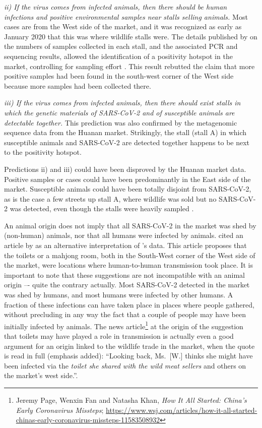 \documentclass[11pt]{article}
\def \sct {\mbox{SARS-CoV-2}}
\begin{document}
\textit{ii) If the virus comes from infected animals, then there should be human infections and positive environmental samples near stalls selling animals.} 
Most cases are from the West side of the market, and it was recognized as early as January 2020 that this was where wildlife stalls were. The details published by \citet{Liu2023Nature} on the numbers of samples collected in each stall, and the associated PCR and sequencing results, allowed the identification of a positivity hotspot in the market, controlling for sampling effort \citep{ACC2023bioRxiv}. This result rebutted the claim that more positive samples had been found in the south-west corner of the West side because more samples had been collected there.

\textit{iii) If the virus comes from infected animals, then there should exist stalls in which the genetic materials of SARS-CoV-2 and of susceptible animals are detectable together.} 
This prediction was also confirmed by the metagenomic sequence data from the Huanan market. Strikingly, the stall (stall A) in which susceptible animals and \sct{} are detected together happens to be next to the positivity hotspot. 

Predictions ii) and iii) could have been disproved by the Huanan market data. Positive samples or cases could have been predominantly in the East side of the market. Susceptible animals could have been totally disjoint from \sct{}, as is the case a few streets up stall A, where wildlife was sold but no \sct{} was detected, even though the stalls were heavily sampled \citep{Liu2023Nature, ACC2023bioRxiv}.

An animal origin does not imply that all \sct{} in the market was shed by (non-human) animals, nor that all humans were infected by animals.  cited an article by \citet{CORibera2022ER} as an alternative interpretation of \citet{Liu2022RS}'s data. This article proposes that the toilets or a mahjong room, both in the South-West corner of the West side of the market, were locations where human-to-human transmission took place. It is important to note that these suggestions are not incompatible with an animal origin –- quite the contrary actually. Most \sct{} detected in the market was shed by humans, and most humans were infected by other humans. A fraction of these infections can have taken place in places where people gathered, without precluding in any way the fact that a couple of people may have been initially infected by animals. The news article\footnote{ 
Jeremy Page, Wenxin Fan and Natasha Khan, \textit{How It All Started: China’s Early Coronavirus Missteps}; \url{https://www.wsj.com/articles/how-it-all-started-chinas-early-coronavirus-missteps-11583508932}} at the origin of the suggestion that toilets may have played a role in transmission is actually even a good argument for an origin linked to the wildlife trade in the market, when the quote is read in full (emphasis added): ``Looking back, Ms.\ [W.] thinks she might have been infected via the \textit{toilet she shared with the wild meat sellers} and others on the market's west side.''.
\end{document}
